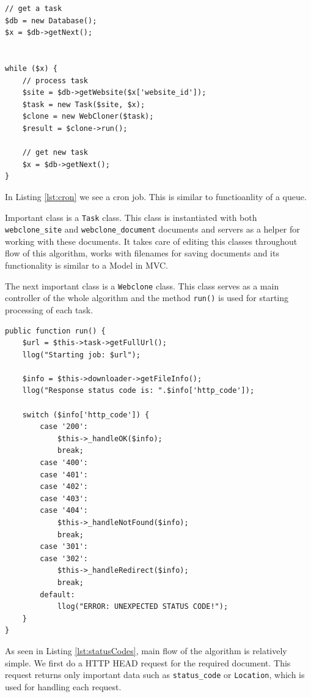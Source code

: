 \begin{lstlisting}[caption={Code executed for each document in cron},label={lst:cron}]
// get a task
$db = new Database();
$x = $db->getNext();


while ($x) {
    // process task
    $site = $db->getWebsite($x['website_id']);
    $task = new Task($site, $x);
    $clone = new WebCloner($task);
    $result = $clone->run();

    // get new task
    $x = $db->getNext();
}
\end{lstlisting}

In Listing \ref{lst:cron} we see a cron job. This is similar to functioanlity of a queue. 

Important class is a \texttt{Task} class. This class is instantiated with both \texttt{webclone\_site} and \texttt{webclone\_document} documents and servers as a helper for working with these documents. It takes care of editing this classes throughout flow of this algorithm, works with filenames for saving documents and its functionality is similar to a Model in MVC.

The next important class is a \texttt{Webclone} class. This class serves as a main controller of the whole algorithm and the method \texttt{run()} is used for starting processing of each task.

\begin{lstlisting}[caption={Handling of status codes returned by a server},label={lst:statusCodes}]
public function run() {
    $url = $this->task->getFullUrl();
    llog("Starting job: $url");

    $info = $this->downloader->getFileInfo();
    llog("Response status code is: ".$info['http_code']);

    switch ($info['http_code']) {
        case '200':
            $this->_handleOK($info);
            break;
        case '400':
        case '401':
        case '402':
        case '403':
        case '404':
            $this->_handleNotFound($info);
            break;
        case '301':
        case '302':
            $this->_handleRedirect($info);
            break;
        default:
            llog("ERROR: UNEXPECTED STATUS CODE!");
    }
}
\end{lstlisting}

As seen in Listing \ref{lst:statusCodes}, main flow of the algorithm is relatively simple. We first do a HTTP HEAD request for the required document. This request returns only important data such as \texttt{status\_code} or \texttt{Location}, which is used for handling each request. 


